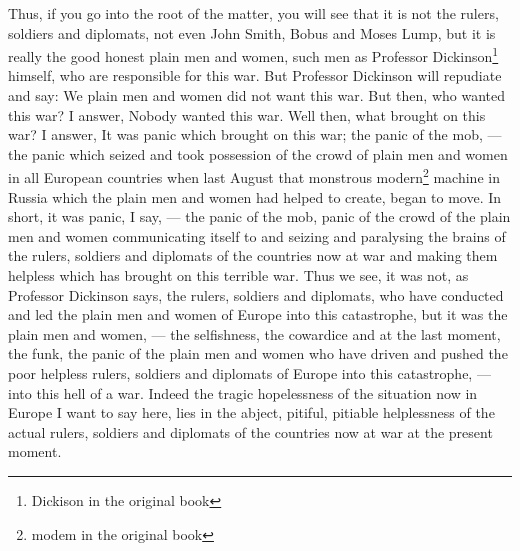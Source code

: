 Thus, if you go into the root of the matter, you will see that it is not the rulers, soldiers and diplomats, not even John Smith, Bobus and Moses Lump, but it is really the good honest plain men and women, such men as Professor Dickinson\footnote{Dickison in the original book} himself, who are responsible for this war.
But Professor Dickinson will repudiate and say: We plain men and women did not want this war.
But then, who wanted this war?
I answer, Nobody wanted this war.
Well then, what brought on this war?
I answer, It was panic which brought on this war; the panic of the mob, --- the panic which seized and took possession of the crowd of plain men and women in all European countries when last August that monstrous modern\footnote{modem in the original book} machine in Russia which the plain men and women had helped to create, began to move.
In short, it was panic, I say, --- the panic of the mob, panic of the crowd of the plain men and women communicating itself to and seizing and paralysing the brains of the rulers, soldiers and diplomats of the countries now at war and making them helpless which has brought on this terrible war.
Thus we see, it was not, as Professor Dickinson says, the rulers, soldiers and diplomats, who have conducted and led the plain men and women of Europe into this catastrophe, but it was the plain men and women, --- the selfishness, the cowardice and at the last moment, the funk, the panic of the plain men and women who have driven and pushed the poor helpless rulers, soldiers and diplomats of Europe into this catastrophe, --- into this hell of a war.
Indeed the tragic hopelessness of the situation now in Europe I want to say here, lies in the abject, pitiful, pitiable helplessness of the actual rulers, soldiers and diplomats of the countries now at war at the present moment.


